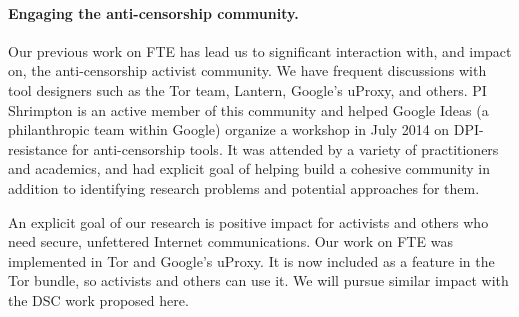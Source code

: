 %



\paragraph{Engaging the anti-censorship community.} Our previous work on FTE has
lead us to significant interaction with, and impact on, the anti-censorship
activist community. We have frequent discussions with tool designers 
such as the Tor team, Lantern, Google's uProxy, and others. PI
Shrimpton is an active member of this community and helped Google Ideas (a
philanthropic team within Google) organize a workshop in July 2014 on DPI-resistance
for anti-censorship tools. It was attended by a variety of practitioners
and academics, and had explicit goal of helping build a cohesive community in
addition to identifying research problems and potential approaches for them.

An explicit goal of our research is positive impact for activists and others who
need secure, unfettered Internet communications. Our work on FTE was
implemented in Tor and Google's uProxy. It is now included as a feature in
the Tor bundle, so activists and others can use it. 
We will pursue similar impact with the DSC work proposed here.



